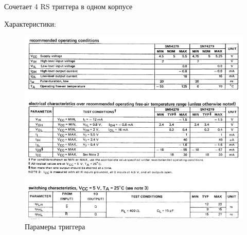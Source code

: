 Сочетает 4 RS триггера в одном корпусе

Характеристики:

\begin{figure}[H]
	\centering
	\includegraphics[width=0.95\linewidth]{imgs/7/ti}
	\caption{Парамеры триггера}
	\label{fig:7_ti}
\end{figure}

